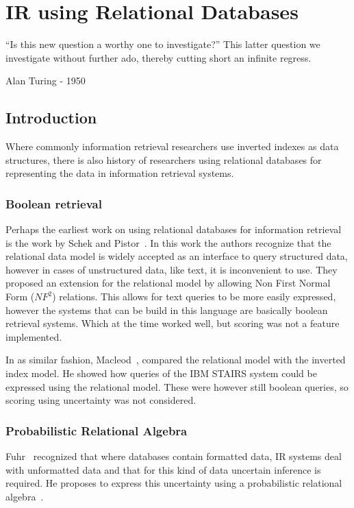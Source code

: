 \chapter{IR using Relational Databases}
\epigraph{``Is this new question a worthy one to investigate?'' This latter question we investigate without further ado, thereby cutting short an infinite regress.}{Alan Turing - 1950}

\section{Introduction}
Where commonly information retrieval researchers use inverted indexes as data structures, there is also history of researchers using relational databases for representing the data in information retrieval systems.

\subsection{Boolean retrieval}
Perhaps the earliest work on using relational databases for information retrieval is the work by Schek and Pistor~\cite{SchekPistor}. In this work the authors recognize that the relational data model is widely accepted as an interface to query structured data, however in cases of unstructured data, like text, it is inconvenient to use. They proposed an extension for the relational model by allowing Non First Normal Form ($NF^2$) relations. This allows for text queries to be more easily expressed, however the systems that can be build in this language are basically boolean retrieval systems. Which at the time worked well, but scoring was not a feature implemented.  

In as similar fashion, Macleod~\cite{macleod}, compared the relational model with the inverted index model. He showed how queries of the IBM STAIRS system could be expressed using the relational model. These were however still boolean queries, so scoring using uncertainty was not considered. 

\subsection{Probabilistic Relational Algebra}
Fuhr~\cite{fuhr1996probabilistic} recognized that where databases contain formatted data, IR systems deal with unformatted data and that for this kind of data uncertain inference is required. He proposes to express this uncertainty using a probabilistic relational algebra~\cite{fuhr-pra}. 

